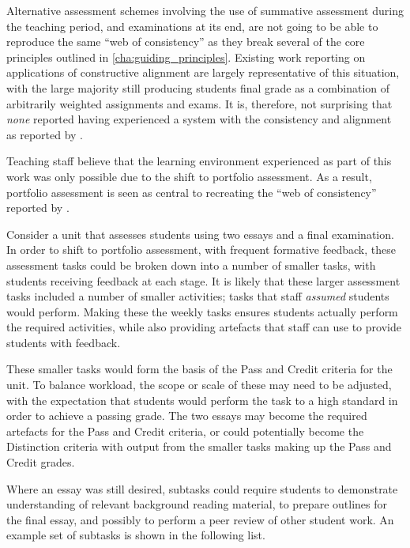 Alternative assessment schemes involving the use of summative assessment during the teaching period, and examinations at its end, are not going to be able to reproduce the same ``web of consistency'' as they break several of the core principles outlined in \cref{cha:guiding_principles}. Existing work reporting on applications of constructive alignment are largely representative of this situation, with the large majority still producing students final grade as a combination of arbitrarily weighted assignments and exams. It is, therefore, not surprising that \emph{none} reported having experienced a system with the consistency and alignment as reported by \cite{Biggs:1996c}. 

Teaching staff believe that the learning environment experienced as part of this work was only possible due to the shift to portfolio assessment. As a result, portfolio assessment is seen as central to recreating the ``web of consistency'' reported by \citet{Biggs:1996c,Biggs:1999}.

Consider a unit that assesses students using two essays and a final examination. In order to shift to portfolio assessment, with frequent formative feedback, these assessment tasks could be broken down into a number of smaller tasks, with students receiving feedback at each stage. It is likely that these larger assessment tasks included a number of smaller activities; tasks that staff \emph{assumed} students would perform. Making these the weekly tasks ensures students actually perform the required activities, while also providing artefacts that staff can use to provide students with feedback.

These smaller tasks would form the basis of the Pass and Credit criteria for the unit. To balance workload, the scope or scale of these may need to be adjusted, with the expectation that students would perform the task to a high standard in order to achieve a passing grade. The two essays may become the required artefacts for the Pass and Credit criteria, or could potentially become the Distinction criteria with output from the smaller tasks making up the Pass and Credit grades.

Where an essay was still desired, subtasks could require students to demonstrate understanding of relevant background reading material, to prepare outlines for the final essay, and possibly to perform a peer review of other student work. An example set of subtasks is shown in the following list. 

